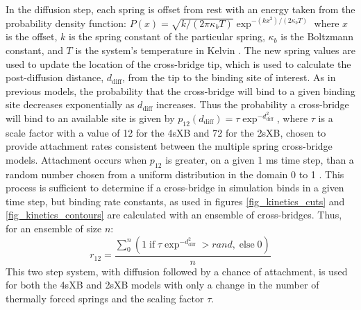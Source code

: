 \documentclass[10pt]{article}
\newcommand{\citep}[1]{\cite{#1}} %
\begin{document}
In the diffusion step, each spring is offset from rest with an energy taken from the probability density function: $P(x) = \sqrt{k / (2 \pi \kappa_b T)} \exp^{-(k x^2)/(2 \kappa_b T)}$ where $x$ is the offset, $k$ is the spring constant of the particular spring, $\kappa_b$ is the Boltzmann constant, and $T$ is the system's temperature in Kelvin  \citep{DillBook, HowardBook}. 
The new spring values are used to update the location of the cross-bridge tip, which is used to calculate the post-diffusion distance, $d_\mathrm{diff}$, from the tip to the binding site of interest.
As in previous models, the probability that the cross-bridge will bind to a given binding site decreases exponentially as $d_\mathrm{diff}$ increases. 
Thus the probability a cross-bridge will bind to an available site is given by $p_{12}(d_\mathrm{diff}) = \tau \exp ^{-d_\mathrm{diff}^2}$, where $\tau$ is a scale factor with a value of 12 for the 4sXB and 72 for the 2sXB, chosen to provide attachment rates consistent between the multiple spring cross-bridge models.
Attachment occurs when $p_{12}$ is greater, on a given 1 ms time step, than a random number chosen from a uniform distribution in the domain 0 to 1 \citep{Tanner2007}.
This process is sufficient to determine if a cross-bridge in simulation binds in a given time step, but binding rate constants, as used in figures \ref{fig_kinetics_cuts} and \ref{fig_kinetics_contours} are calculated with an ensemble of cross-bridges. 
Thus, for an ensemble of size $n$:
\begin{equation}
    r_{12} =  \frac{\sum_0^n \left( 1\; \textrm{if}\; \tau \exp^{-d_\mathrm{diff}^2}>rand ,\; \textrm{else}\; 0 \right)}{n}  
    \label{eq_r12}
\end{equation}
This two step system, with diffusion followed by a chance of attachment, is used for both the 4sXB and 2sXB models with only a change in the number of thermally forced springs and the scaling factor $\tau$.
\end{document}
